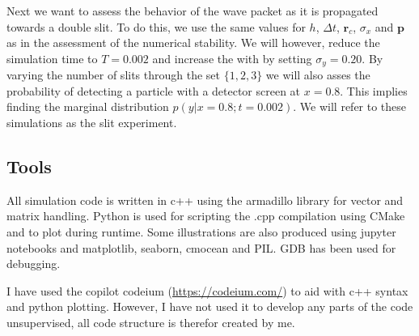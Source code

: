 \documentclass[../main_proj5.tex]{subfiles}
\begin{document}
Next we want to assess the behavior of the wave packet as it is propagated towards a double slit. To do this, we use the same values for $h$, $\Delta t$, $\mathbf{r}_c$, $\sigma_x$ and $\mathbf{p}$ as in the assessment of the numerical stability. We will however, reduce the simulation time to $T = 0.002$ and increase the with by setting $\sigma_y=0.20$. By varying the number of slits through the set $\{1, 2, 3\}$ we will also asses the probability of detecting a particle with a detector screen at $x=0.8$. This implies finding the marginal distribution $p(y|x=0.8 ;t=0.002)$. We will refer to these simulations as the slit experiment. 


\subsection{Tools}

All simulation code is written in c++ using the armadillo library for vector and matrix handling. Python is used for scripting the .cpp compilation using CMake and to plot during runtime. Some illustrations are also produced using jupyter notebooks and matplotlib, seaborn, cmocean and PIL. GDB has been used for debugging. 

I have used the copilot codeium (\href{https://codeium.com/}{https://codeium.com/}) to aid with c++ syntax and python plotting. However, I have not used it to develop any parts of the code unsupervised, all code structure is therefor created by me.
\end{document}
